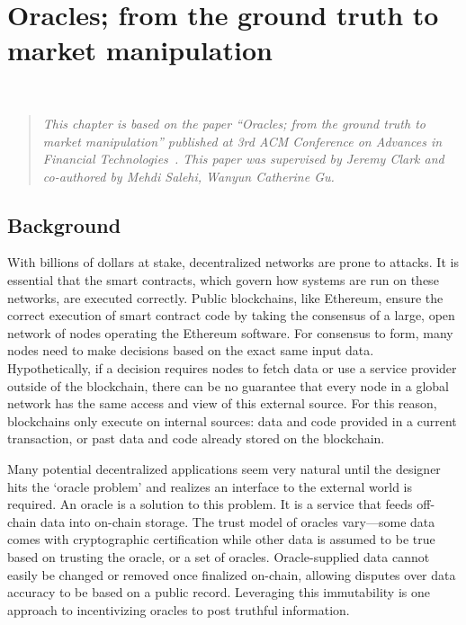 \chapter{Oracles; from the ground truth to market manipulation} ~\label{sec:oracles}

\begin{quote}
	\textit{This chapter is based on the paper ``Oracles; from the ground truth to market manipulation'' published at 3rd ACM Conference on Advances in Financial Technologies~\cite{eskandari2021sok}. This paper was supervised by Jeremy Clark and co-authored by Mehdi Salehi, Wanyun Catherine Gu.}
\end{quote}


\section{Background}


With billions of dollars at stake, decentralized networks are prone to attacks. It is essential that the smart contracts, which govern how systems are run on these networks, are executed correctly. Public blockchains, like Ethereum, ensure the correct execution of smart contract code by taking the consensus of a large, open network of nodes operating the Ethereum software. For consensus to form, many nodes need to make decisions based on the exact same input data. Hypothetically, if a decision requires nodes to fetch data or use a service provider outside of the blockchain, there can be no guarantee that every node in a global network has the same access and view of this external source. For this reason, blockchains only execute on internal sources: data and code provided in a current transaction, or past data and code already stored on the blockchain.

Many potential decentralized applications seem very natural until the designer hits the `oracle problem' and realizes an interface to the external world is required. An oracle is a solution to this problem. It is a service that feeds off-chain data into on-chain storage. The trust model of oracles vary---some data comes with cryptographic certification while other data is assumed to be true based on trusting the oracle, or a set of oracles. Oracle-supplied data cannot easily be changed or removed once finalized on-chain, allowing disputes over data accuracy to be based on a public record. Leveraging this immutability is one approach to incentivizing oracles to post truthful information.

